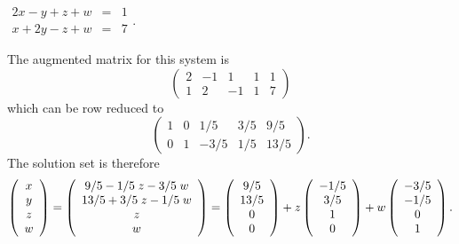 \documentclass{ximera}
\begin{document}
\begin{exercise} \label{c2.3.10b}
$\begin{array}{rcl}
2x-y+z+w & = & 1\\
   x+2y-z+w & = & 7 \end{array}$.


\begin{solution}
\soln The augmented matrix for this system is
\[
\left(\begin{array}{rrrr|r} 2 & -1 & 1 & 1 & 1 \\ 1 & 2 & -1 & 1 & 7
\end{array}\right)
\]
which can be row reduced to
\[
\left(\begin{array}{rrrr|r} 1 & 0 & 1/5 & 3/5 &
9/5 \\ 0 & 1 & -3/5 & 1/5 & 13/5
\end{array}\right).
\]
The solution set is therefore
\[
\left(\begin{array}{c} x \\ y \\ z \\ w \end{array}\right) =
\left(\begin{array}{c} 9/5 - 1/5\; z - 3/5\; w
\\ 13/5 + 3/5\; z - 1/5 \; w \\ z \\ w \end{array}\right)=
\left(\begin{array}{cccccccccccc} 9/5 \\ 13/5 \\ 0 \\ 0 \end{array}\right) + z\left(\begin{array}{cccccccccccc} -1/5\\  3/5 \\ 1 \\ 0 \end{array}\right) + w\left(\begin{array}{cccccccccccc} -3/5 \\ -1/5 \\ 0 \\ 1 \end{array}\right).
\]

\end{solution}
\end{exercise}
\end{document}
